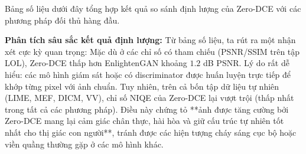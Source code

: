\documentclass[a4paper]{article}
\begin{document}
Bảng số liệu dưới đây tổng hợp kết quả so sánh định lượng của Zero-DCE với các phương pháp đối thủ hàng đầu.

\begin{table}[H]
\centering
\caption{Đánh giá định lượng (PSNR/SSIM trên tập LOL; chỉ số NIQE trung bình trên 4 tập dữ liệu không tham chiếu LIME, MEF, DICM, VV)}
\label{tab:quantitative_results}
\setlength{\tabcolsep}{5pt}
\end{table}

\noindent \textbf{Phân tích sâu sắc kết quả định lượng:}
Từ bảng số liệu, ta rút ra một nhận xét cực kỳ quan trọng:
Mặc dù ở các chỉ số có tham chiếu (PSNR/SSIM trên tập LOL), Zero-DCE thấp hơn EnlightenGAN khoảng $1.2$ dB PSNR. Lý do rất dễ hiểu: các mô hình giám sát hoặc có discriminator được huấn luyện trực tiếp để khớp từng pixel với ảnh chuẩn. Tuy nhiên, trên cả bốn tập dữ liệu tự nhiên (LIME, MEF, DICM, VV), chỉ số NIQE của Zero-DCE lại vượt trội (thấp nhất trong tất cả các phương pháp). Điều này chứng tỏ **ảnh được tăng cường bởi Zero-DCE mang lại cảm giác chân thực, hài hòa và giữ cấu trúc tự nhiên tốt nhất cho thị giác con người**, tránh được các hiện tượng cháy sáng cục bộ hoặc viền quầng thường gặp ở các mô hình khác.
\end{document}
